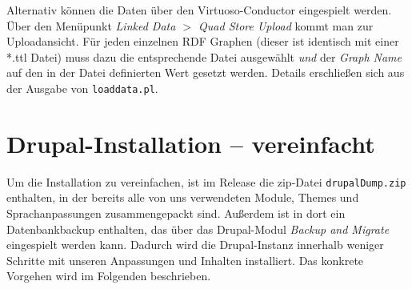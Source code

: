 \documentclass[a4paper,11pt,twoside]{article}
\begin{document}
Alternativ können die Daten über den Virtuoso-Conductor eingespielt werden.
Über den Menüpunkt \textit{Linked Data $>$ Quad Store Upload} kommt man zur
Uploadansicht.  Für jeden einzelnen RDF Graphen (dieser ist identisch mit einer
*.ttl Datei) muss dazu die entsprechende Datei ausgewählt \emph{und} der
\textit{Graph Name} auf den in der Datei definierten Wert gesetzt werden.
Details erschließen sich aus der Ausgabe von \texttt{loaddata.pl}.

\section{Drupal-Installation -- vereinfacht}
Um die Installation zu vereinfachen, ist im Release die zip-Datei
\texttt{drupalDump.zip} enthalten, in der bereits alle von uns verwendeten
Module, Themes und Sprachanpassungen zusammengepackt sind. Außerdem ist in dort
ein Datenbankbackup enthalten, das über das Drupal-Modul \emph{Backup and
  Migrate} eingespielt werden kann.  Dadurch wird die Drupal-Instanz innerhalb
weniger Schritte mit unseren Anpassungen und Inhalten installiert. Das konkrete
Vorgehen wird im Folgenden beschrieben.
\end{document}
